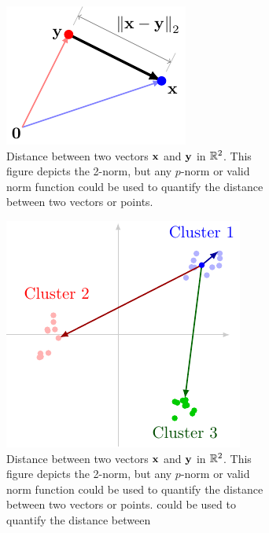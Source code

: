 \begin{figure}[h]
    \centering
    \begin{subfigure}[b]{0.35\textwidth}
        \includegraphics[width=0.95\linewidth]{figure/chapter01/dist-demo.pdf}
        \caption{Distance between two vectors $\mathbf{x}$ and $\mathbf{y}$ in $\mathbb{R}^2$. This figure depicts the 2-norm, but any $p$-norm or valid norm function could be used to quantify the distance between two vectors or points.}
        \label{fig:ch01-dist1}
    \end{subfigure}
    \hspace{0.05\textwidth}
    \begin{subfigure}[b]{0.4\textwidth}
        \centering
        \includegraphics[width=0.85\linewidth]{figure/chapter01/cluster-dist.pdf}
        \caption{Distance between two vectors $\mathbf{x}$ and $\mathbf{y}$ in $\mathbb{R}^2$. This figure depicts the 2-norm, but any $p$-norm or valid norm function could be used to quantify the distance between two vectors or points.  could be used to quantify the distance between}
        \label{fig:ch01-dist-clusters}
    \end{subfigure}
    \caption{}
\end{figure}


